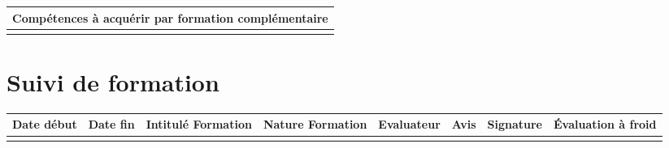 \documentclass[11pt]{article}
\begin{document}
\begin{table}[!hp]
\centering
	\begin{tabularx}{\linewidth}{|X|}
	\hline
	\rowcolor{gray!40} Compétences à acquérir par formation complémentaire \\
	\hline
	  \\
	\hline
	\end{tabularx}
\end{table}

\section*{\large Suivi de formation}

\begin{table}[!hp]
\centering
	\begin{tabularx}{\linewidth}{|X|X|X|X|X|X|X|X|}
	\hline
	\rowcolor{gray!40} \tiny Date début & \tiny Date fin & \tiny Intitulé Formation & \tiny Nature Formation & \tiny Evaluateur & \tiny Avis & \tiny Signature & \tiny Évaluation à froid \\
	\hline
	 & & & & & & & \\
	\hline
	\end{tabularx}
\end{table}
\end{document}
